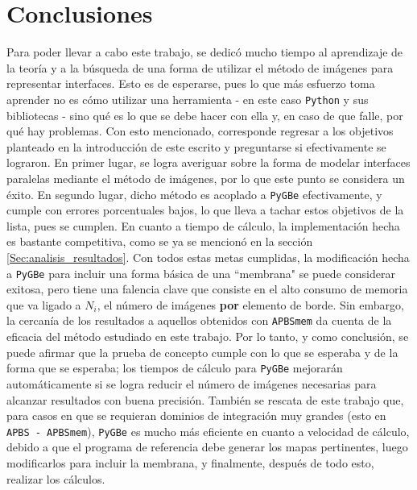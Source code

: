 \documentclass[12pt, oneside, numbers, spanish]{ezthesis}
\numberwithin{equation}{section}
\begin{document}
\chapter{Conclusiones}
Para poder llevar a cabo este trabajo, se dedicó mucho tiempo al aprendizaje de la teoría y a la búsqueda de una forma de utilizar el método de imágenes para representar interfaces. Esto es de esperarse, pues lo que más esfuerzo toma aprender no es cómo utilizar una herramienta - en este caso \texttt{Python} y sus bibliotecas - sino qué es lo que se debe hacer con ella y, en caso de que falle, por qué hay problemas. Con esto mencionado, corresponde regresar a los objetivos planteado en la introducción de este escrito y preguntarse si efectivamente se lograron. En primer lugar, se logra averiguar sobre la forma de modelar interfaces paralelas mediante el método de imágenes, por lo que este punto se considera un éxito. En segundo lugar, dicho método es acoplado a \texttt{PyGBe} efectivamente, y cumple con errores porcentuales bajos, lo que lleva a tachar estos objetivos de la lista, pues se cumplen. En cuanto a tiempo de cálculo, la implementación hecha es bastante competitiva, como se ya se mencionó en la sección \ref{Sec:analisis_resultados}. Con todos estas metas cumplidas, la modificación hecha a \texttt{PyGBe} para incluir una forma básica de una ``membrana" se puede considerar exitosa, pero tiene una falencia clave que consiste en el alto consumo de memoria que va ligado a $N_i$, el número de imágenes \textbf{por} elemento de borde. Sin embargo, la cercanía de los resultados a aquellos obtenidos con \texttt{APBSmem} da cuenta de la eficacia del método estudiado en este trabajo. Por lo tanto, y como conclusión, se puede afirmar que la prueba de concepto cumple con lo que se esperaba y de la forma que se esperaba; los tiempos de cálculo para \texttt{PyGBe} mejorarán automáticamente si se logra reducir el número de imágenes necesarias para alcanzar resultados con buena precisión. También se rescata de este trabajo que, para casos en que se requieran dominios de integración muy grandes (esto en \texttt{APBS - APBSmem}), \texttt{PyGBe} es mucho más eficiente en cuanto a velocidad de cálculo, debido a que el programa de referencia debe generar los mapas pertinentes, luego modificarlos para incluir la membrana, y finalmente, después de todo esto, realizar los cálculos.
\end{document}
